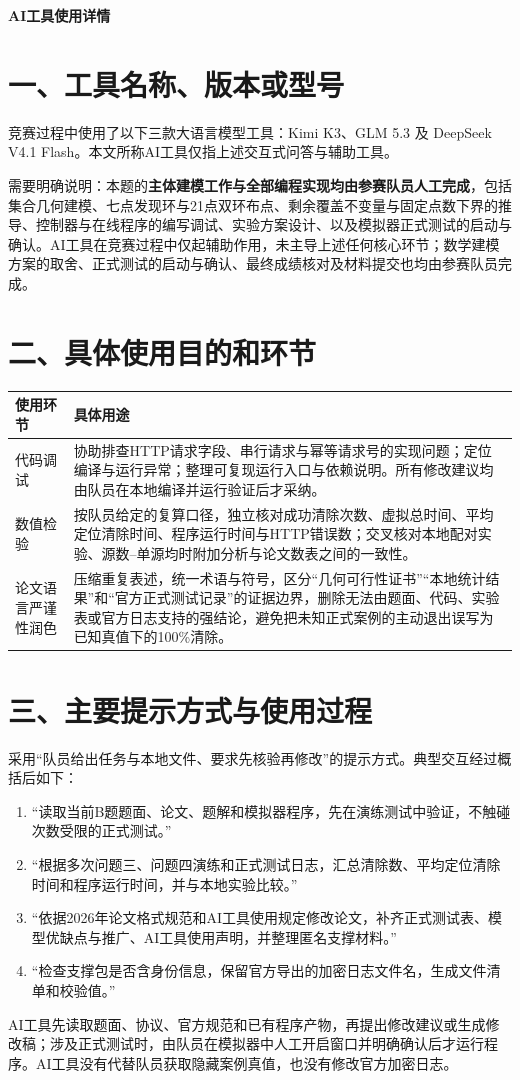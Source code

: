 \documentclass[UTF8,a4paper,zihao=-4,fontset=fandol]{ctexart}
\begin{document}
\begin{center}{\bfseries AI工具使用详情}\end{center}

\section*{一、工具名称、版本或型号}
竞赛过程中使用了以下三款大语言模型工具：Kimi K3、GLM 5.3 及 DeepSeek V4.1 Flash。本文所称AI工具仅指上述交互式问答与辅助工具。

需要明确说明：本题的\textbf{主体建模工作与全部编程实现均由参赛队员人工完成}，包括集合几何建模、七点发现环与21点双环布点、剩余覆盖不变量与固定点数下界的推导、控制器与在线程序的编写调试、实验方案设计、以及模拟器正式测试的启动与确认。AI工具在竞赛过程中仅起辅助作用，未主导上述任何核心环节；数学建模方案的取舍、正式测试的启动与确认、最终成绩核对及材料提交也均由参赛队员完成。

\section*{二、具体使用目的和环节}
\begin{longtable}{>{\raggedright\arraybackslash}p{3.0cm}>{\raggedright\arraybackslash}p{9.9cm}}
\toprule 使用环节&具体用途\\\midrule\endhead
代码调试&协助排查HTTP请求字段、串行请求与幂等请求号的实现问题；定位编译与运行异常；整理可复现运行入口与依赖说明。所有修改建议均由队员在本地编译并运行验证后才采纳。\\
数值检验&按队员给定的复算口径，独立核对成功清除次数、虚拟总时间、平均定位清除时间、程序运行时间与HTTP错误数；交叉核对本地配对实验、源数--单源均时附加分析与论文数表之间的一致性。\\
论文语言严谨性润色&压缩重复表述，统一术语与符号，区分“几何可行性证书”“本地统计结果”和“官方正式测试记录”的证据边界，删除无法由题面、代码、实验表或官方日志支持的强结论，避免把未知正式案例的主动退出误写为已知真值下的100\%清除。\\
\bottomrule
\end{longtable}

\section*{三、主要提示方式与使用过程}
采用“队员给出任务与本地文件、要求先核验再修改”的提示方式。典型交互经过概括后如下：
\begin{enumerate}
\item “读取当前B题题面、论文、题解和模拟器程序，先在演练测试中验证，不触碰次数受限的正式测试。”
\item “根据多次问题三、问题四演练和正式测试日志，汇总清除数、平均定位清除时间和程序运行时间，并与本地实验比较。”
\item “依据2026年论文格式规范和AI工具使用规定修改论文，补齐正式测试表、模型优缺点与推广、AI工具使用声明，并整理匿名支撑材料。”
\item “检查支撑包是否含身份信息，保留官方导出的加密日志文件名，生成文件清单和校验值。”
\end{enumerate}
AI工具先读取题面、协议、官方规范和已有程序产物，再提出修改建议或生成修改稿；涉及正式测试时，由队员在模拟器中人工开启窗口并明确确认后才运行程序。AI工具没有代替队员获取隐藏案例真值，也没有修改官方加密日志。
\end{document}
